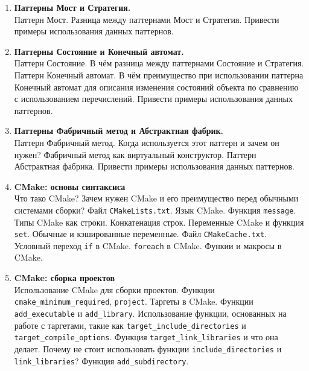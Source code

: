 \documentclass{article}
\begin{document}
\begin{enumerate}
\item \textbf{Паттерны Мост и Стратегия.}\\
Паттерн Мост. Разница между паттернами Мост и Стратегия. Привести примеры использования данных паттернов.


\item \textbf{Паттерны Состояние и Конечный автомат.}\\
Паттерн Состояние. В чём разница между паттернами Состояние и Стратегия. Паттерн Конечный автомат. В чём преимущество при использовании паттерна Конечный автомат для описания изменения состояний объекта по сравнению с использованием перечислений. Привести примеры использования данных паттернов.

\item \textbf{Паттерны Фабричный метод и Абстрактная фабрик.}\\
Паттерн Фабричный метод. Когда используется этот паттерн и зачем он нужен? Фабричный метод как виртуальный конструктор. Паттерн Абстрактная фабрика. Привести примеры использования данных паттернов.


\item \textbf{CMake: основы синтаксиса}\\
Что тако CMake? Зачем нужен CMake и его преимущество перед обычными системами сборки? Файл \texttt{CMakeLists.txt}. Язык CMake. Функция \texttt{message}. Типы CMake как строки. Конкатенация строк. Переменные CMake и функция \texttt{set}. Обычные и кэшированные переменные. Файл \texttt{CMakeCache.txt}. Условный переход \texttt{if} в CMake. \texttt{foreach} в CMake. Функии и макросы в CMake.

\item \textbf{CMake: сборка проектов}\\
Использование CMake для сборки проектов. Функции \texttt{cmake\_minimum\_required}, \texttt{project}. Таргеты в CMake. Функции \texttt{add\_executable} и \texttt{add\_library}. Использование функции, основанных на работе с таргетами, такие как \texttt{target\_include\_directories} и \texttt{target\_compile\_options}. Функция \texttt{target\_link\_libraries} и что она делает. Почему не стоит использовать функции \texttt{include\_directories} и \texttt{link\_libraries}? Функция \texttt{add\_subdirectory}. 


\end{enumerate}
\end{document}
